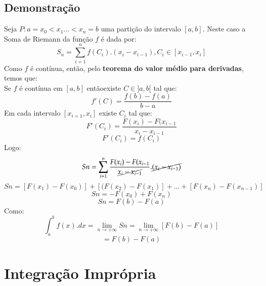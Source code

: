 \documentclass{article}
\begin{document}
		\subsection{Demonstração}
			Seja $P: a=x_0<x_1...<x_n=b$ uma partição do intervalo $[a,b]$. Neste caso a Soma de Riemann da função $f$ é dada por:
				$$S_n=\sum_{i=1}^n f(C_i).(x_i-x_{i-1}),C_i \in [x_{i-1},x_i]$$
			Como $f$ é contínua, então, pelo \textbf{teorema do valor médio para derivadas}, temos que:\\
				Se $f$ é contínua em $[a,b]$ entãoexiste $C \in ]a,b[$ tal que:
				$$f'(C) = \dfrac{f(b)-f(a)}{b-a}$$
			Em cada intervalo $[x_{i=1},x_i]$ existe $C_i$ tal que:
				$$F'(C_i)=\dfrac{F(x_i)-F(x_{i-1}}{x_i-x_{i-1}}$$
				$$F'(C_i)=f(C_i)$$
			Logo:
				$$Sn= \sum_{i=1}^n \dfrac{F(x_i)-F(x_{i-1}}{\cancel{x_i-x_{i-1}}}.\cancel{(x_i-x_{i-1})}$$
				$$Sn = [F(x_1)-F(x_0)]+[(F(x_2)-F(x_1)]+...+[F(x_n)-F(x_{n-1})]$$
				$$Sn = -F(x_0)+F(x_n)$$
				$$Sn=F(b)-F(a)$$
			Como:
				$$\int_a^bf(x).dx = \lim_{n\to +\infty}Sn=\lim_{n \to +\infty}[F(b)-F(a)]$$
				$$=F(b)-F(a)$$
	\section{Integração Imprópria}
\end{document}
